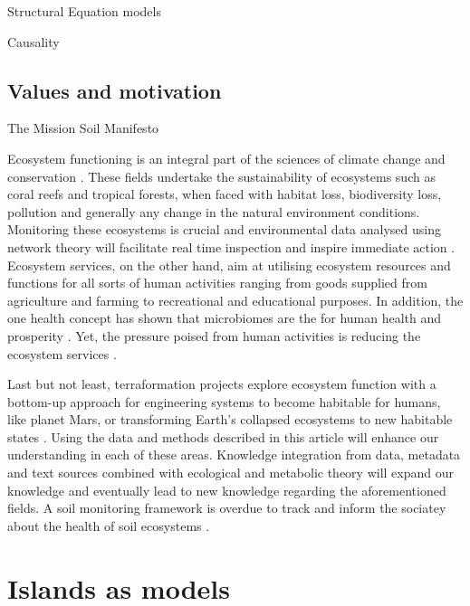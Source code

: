 Structural Equation models

Causality

\subsection{Values and motivation}
\label{sec:values}

The Mission Soil Manifesto

Ecosystem functioning is an integral part of the sciences of climate change
and conservation \parencite{cavicchioli2019scientists}. These fields undertake the
sustainability of ecosystems such as coral reefs and tropical forests, when
faced with habitat loss, biodiversity loss, pollution and generally any change
in the natural environment conditions. Monitoring these ecosystems is crucial
and environmental data analysed using network theory will facilitate real time
inspection and inspire immediate action \parencite{derocles2018Biomonitoring}.
Ecosystem services, on the other hand, aim at utilising ecosystem resources
and functions for all sorts of human activities ranging from goods supplied
from agriculture and farming \parencite{alvarez-silva2017Compartmentalized} to
recreational and educational purposes. In addition, the one health concept has
shown that microbiomes are the for human health and prosperity
\parencite{banerjee2023Soil, lehmann2020concept}. Yet, the pressure poised from human activities
is reducing the ecosystem services \parencite{rillig2023Increasing}.

Last but not least, terraformation
projects explore ecosystem function with a bottom-up approach for engineering
systems to become habitable for humans, like planet Mars, or transforming
Earth's collapsed ecosystems to new habitable states
\parencite{conde-pueyo2020Synthetic}. Using the data and methods described in this
article will enhance our understanding in each of these areas. Knowledge
integration from data, metadata and text sources combined with ecological and
metabolic theory will expand our knowledge and eventually lead to new
knowledge regarding the aforementioned fields. A soil monitoring framework 
is overdue to track and inform the sociatey about the health of 
soil ecosystems \parencite{guerra2021tracking}.

\section{Islands as models}
\label{sec:island-model}

